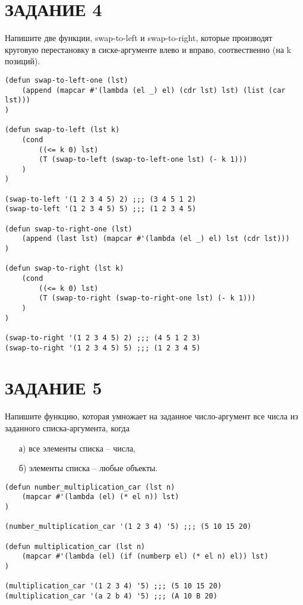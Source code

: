\section{ЗАДАНИЕ 4}

Напишите две функции, swap-to-left и swap-to-right, которые производят круговую
перестановку в сиске-аргументе влево и вправо, соотвественно (на k позиций).

\begin{lstlisting}
(defun swap-to-left-one (lst)
    (append (mapcar #'(lambda (el _) el) (cdr lst) lst) (list (car lst)))
)

(defun swap-to-left (lst k)
    (cond
        ((<= k 0) lst)
        (T (swap-to-left (swap-to-left-one lst) (- k 1)))
    )
)

(swap-to-left '(1 2 3 4 5) 2) ;;; (3 4 5 1 2)
(swap-to-left '(1 2 3 4 5) 5) ;;; (1 2 3 4 5)

(defun swap-to-right-one (lst)
    (append (last lst) (mapcar #'(lambda (el _) el) lst (cdr lst)))
)

(defun swap-to-right (lst k)
    (cond
        ((<= k 0) lst)
        (T (swap-to-right (swap-to-right-one lst) (- k 1)))
    )
)

(swap-to-right '(1 2 3 4 5) 2) ;;; (4 5 1 2 3)
(swap-to-right '(1 2 3 4 5) 5) ;;; (1 2 3 4 5)
\end{lstlisting}

\section{ЗАДАНИЕ 5}

Напишите функцию, которая умножает на заданное число-аргумент
все числа из заданного списка-аргумента, когда

\begin{enumerate}
    \item[а)] все элементы списка -- числа,
    \item[б)] элементы списка -- любые объекты.
\end{enumerate}

\begin{lstlisting}
(defun number_multiplication_car (lst n)
    (mapcar #'(lambda (el) (* el n)) lst)
)

(number_multiplication_car '(1 2 3 4) '5) ;;; (5 10 15 20)

(defun multiplication_car (lst n)
    (mapcar #'(lambda (el) (if (numberp el) (* el n) el)) lst)
)

(multiplication_car '(1 2 3 4) '5) ;;; (5 10 15 20)
(multiplication_car '(a 2 b 4) '5) ;;; (A 10 B 20)
\end{lstlisting}

